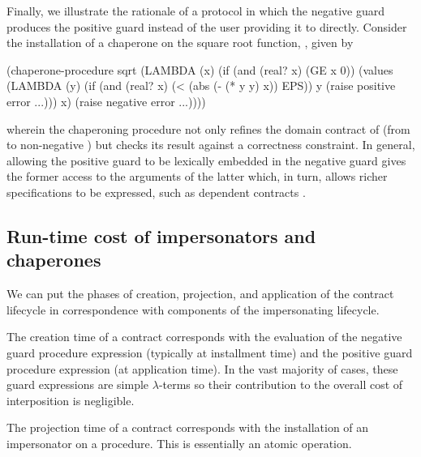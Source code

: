 \documentclass{sigplanconf}
\begin{document}
Finally, we illustrate the rationale of a protocol in which the negative guard produces the positive guard instead of the user providing it to  directly.
Consider the installation of a chaperone on the square root function, , given by
\begin{schemedisplay}
(chaperone-procedure
 sqrt
 (LAMBDA (x)
   (if (and (real? x) (GE x 0))
       (values (LAMBDA (y)
                 (if (and (real? x) (< (abs (- (* y y) x)) EPS))
                     y
                     (raise positive error ...)))
               x)
       (raise negative error ...))))
\end{schemedisplay}
wherein the chaperoning procedure not only refines the domain contract of  (from  to non-negative ) but checks its result against a correctness constraint.
In general, allowing the positive guard to be lexically embedded in the negative guard gives the former access to the arguments of the latter which, in turn, allows richer specifications to be expressed, such as dependent contracts \cite{findler2002contracts}.

\subsection{Run-time cost of impersonators and chaperones}

We can put the phases of creation, projection, and application of the contract lifecycle in correspondence with components of the impersonating lifecycle.

The creation time of a contract corresponds with the evaluation of the negative guard procedure expression (typically at installment time) and the positive guard procedure expression (at application time).
In the vast majority of cases, these guard expressions are simple $\lambda$-terms so their contribution to the overall cost of interposition is negligible.

The projection time of a contract corresponds with the installation of an impersonator on a procedure.
This is essentially an atomic operation.
\end{document}
